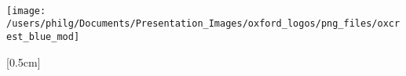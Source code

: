 \documentclass[../thesis-main.tex]{subfiles}
\begin{document}
 \begin{titlepage}
  \begin{center}
   \Huge
   {\bf \xtitle}\\
   \vspace*{1.5cm}
   {\Large \bf
    \xauthor\\
    \xcollege\\
   }
   \vspace*{2.5cm}
   \centerline
   {
    \texttt{[image: /users/philg/Documents/Presentation\_Images/oxford\_logos/png\_files/oxcrest\_blue\_mod]}
   }
   \vspace*{1.5cm}
   \normalsize
   
   [0.5cm]
   {\bf \xterm}\\
   
   \vfill
   
  \end{center}
 \end{titlepage}
\end{document}
